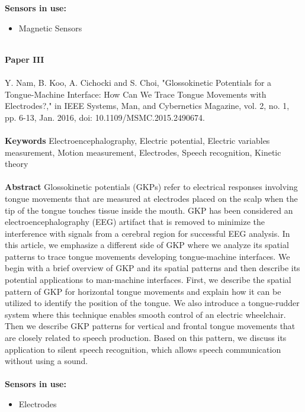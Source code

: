 \noindent
\textbf{Sensors in use:}
\begin{itemize}
    \item Magnetic Sensors \\ \\
\end{itemize}


\noindent
\textbf{Paper III} 
\\ \\
\noindent
Y. Nam, B. Koo, A. Cichocki and S. Choi, "Glossokinetic Potentials for a Tongue-Machine Interface: How Can We Trace Tongue Movements with Electrodes?," in IEEE Systems, Man, and Cybernetics Magazine, vol. 2, no. 1, pp. 6-13, Jan. 2016, doi: 10.1109/MSMC.2015.2490674.\\ \\

\noindent
\textbf{Keywords} Electroencephalography, Electric potential, Electric variables measurement, Motion measurement, Electrodes, Speech recognition, Kinetic theory
\\ \\

\noindent
\textbf{Abstract} Glossokinetic potentials (GKPs) refer to electrical responses involving tongue movements that are measured at electrodes placed on the scalp when the tip of the tongue touches tissue inside the mouth. GKP has been considered an electroencephalography (EEG) artifact that is removed to minimize the interference with signals from a cerebral region for successful EEG analysis. In this article, we emphasize a different side of GKP where we analyze its spatial patterns to trace tongue movements developing tongue-machine interfaces. We begin with a brief overview of GKP and its spatial patterns and then describe its potential applications to man-machine interfaces. First, we describe the spatial pattern of GKP for horizontal tongue movements and explain how it can be utilized to identify the position of the tongue. We also introduce a tongue-rudder system where this technique enables smooth control of an electric wheelchair. Then we describe GKP patterns for vertical and frontal tongue movements that are closely related to speech production. Based on this pattern, we discuss its application to silent speech recognition, which allows speech communication without using a sound.
\\ \\


\noindent
\textbf{Sensors in use:}
\begin{itemize}
    \item Electrodes \\ \\
\end{itemize}

